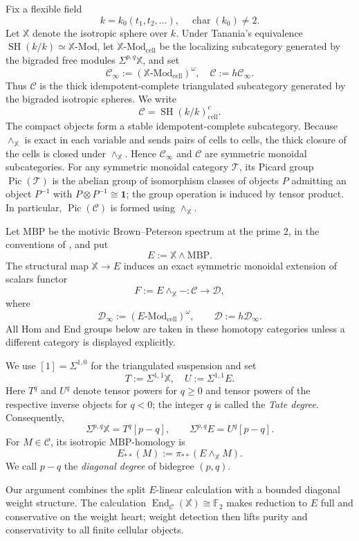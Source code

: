 \documentclass[11pt]{amsart}
\numberwithin{equation}{section}
\theoremstyle{definition}
\theoremstyle{remark}
\DeclareMathOperator{\Pic}{Pic}
\DeclareMathOperator{\End}{End}
\DeclareMathOperator{\SH}{SH}
\newcommand{\MBP}{\mathrm{MBP}}
\newcommand{\F}{\mathbb F_2}
\newcommand{\X}{\mathbb X}
\newcommand{\one}{\mathbf 1}
\newcommand{\Cinf}{\mathcal C_{\infty}}
\newcommand{\Dinf}{\mathcal D_{\infty}}
\newcommand{\C}{\mathcal C}
\newcommand{\D}{\mathcal D}
\newcommand{\cell}{\mathrm{cell}}
\newcommand{\Mod}{\mathrm{Mod}}
\begin{document}
Fix a flexible field
\[
  k=k_0(t_1,t_2,\ldots),
  \quad \operatorname{char}(k_0)\ne2.
\]
Let $\X$ denote the isotropic sphere over $k$.  Under Tanania's equivalence
$\SH(k/k)\simeq\X\text{-}\Mod$, let
$\X\text{-}\Mod_{\cell}$ be the localizing subcategory generated by the
bigraded free modules $\Sigma^{p,q}\X$, and set
\[
  \Cinf:=(\X\text{-}\Mod_{\cell})^\omega,
  \quad
  \C:=h\Cinf.
\]
Thus $\C$ is the thick idempotent-complete triangulated subcategory generated
by the bigraded isotropic spheres.  We write
\[
  \C=\SH(k/k)^c_{\cell}.
\]
The compact objects form a stable idempotent-complete subcategory.  Because
$\wedge_{\X}$ is exact in each variable and sends pairs of cells to cells,
the thick closure of the cells is closed under $\wedge_{\X}$.  Hence $\Cinf$
and $\C$ are symmetric monoidal subcategories.  For any symmetric monoidal category
$\mathcal T$, its Picard group $\Pic(\mathcal T)$ is the abelian group of
isomorphism classes of objects $P$ admitting an object $P^{-1}$ with
$P\otimes P^{-1}\cong\one$; the group operation is induced by tensor
product.  In particular, $\Pic(\C)$ is formed using $\wedge_{\X}$.

Let $\MBP$ be the motivic Brown--Peterson spectrum at the prime $2$, in the
conventions of \cite{TananiaCellular,VezzosiMBP}, and put
\[
  E:=\X\wedge\MBP.
\]
The structural map $\X\to E$ induces an exact symmetric monoidal extension of
scalars functor
\[
  F:=E\wedge_{\X}-\colon\C\longrightarrow\D,
\]
where
\[
  \Dinf:=(E\text{-}\Mod_{\cell})^\omega,
  \qquad
  \D:=h\Dinf.
\]
All Hom and End groups below are taken in these homotopy categories unless a
different category is displayed explicitly.

We use $[1]=\Sigma^{1,0}$ for the triangulated suspension and set
\[
  T:=\Sigma^{1,1}\X,
  \quad
  U:=\Sigma^{1,1}E.
\]
Here $T^q$ and $U^q$ denote tensor powers for $q\geq0$ and tensor powers of
the respective inverse objects for $q<0$; the integer $q$ is called the
\emph{Tate degree}.  
Consequently,
\begin{equation}\label{eq:suspension-convention}
  \Sigma^{p,q}\X=T^q[p-q],
  \qquad
  \Sigma^{p,q}E=U^q[p-q].
\end{equation}
For $M\in\C$, its isotropic $\MBP$-homology is
\[
  E_{**}(M):=\pi_{**}(E\wedge_{\X}M).
\]
We call $p-q$ the \emph{diagonal degree} of bidegree $(p,q)$.

Our argument combines the split $E$-linear calculation with a bounded
diagonal weight structure.  The calculation $\End_{\C}(\X)\cong\F$ makes
reduction to $E$ full and conservative on the weight heart; weight detection
then lifts purity and conservativity to all finite cellular objects.
\end{document}
